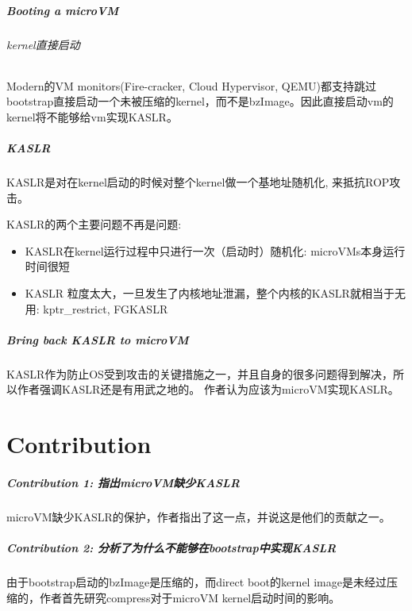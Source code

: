 \documentclass[
    aspectratio=169,  %
]{ctexbeamer}
\begin{document}
\begin{frame}
  \frametitle{Booting a microVM}
  \framesubtitle{kernel直接启动}

  Modern的VM monitors(Fire-cracker, Cloud Hypervisor, QEMU)都支持跳过bootstrap直接启动一个未被压缩的kernel，而不是bzImage。因此直接启动vm的kernel将不能够给vm实现KASLR。
\end{frame}

\begin{frame}
  \frametitle{KASLR}
  KASLR是对在kernel启动的时候对整个kernel做一个基地址随机化, 来抵抗ROP攻击。

  KASLR的两个主要问题不再是问题:
  \begin{itemize}
    \item KASLR在kernel运行过程中只进行一次（启动时）随机化: microVMs本身运行时间很短
    \item KASLR 粒度太大，一旦发生了内核地址泄漏，整个内核的KASLR就相当于无用: kptr\_restrict, FGKASLR
  \end{itemize}
\end{frame}

\begin{frame}
  \frametitle{Bring back KASLR to microVM}

  KASLR作为防止OS受到攻击的关键措施之一，并且自身的很多问题得到解决，所以作者强调KASLR还是有用武之地的。
  作者认为应该为microVM实现KASLR。

\end{frame}

\part{Contribution}

\begin{frame}
  \frametitle{Contribution 1: 指出microVM缺少KASLR}
  microVM缺少KASLR的保护，作者指出了这一点，并说这是他们的贡献之一。
\end{frame}

\begin{frame}
  \frametitle{Contribution 2: 分析了为什么不能够在bootstrap中实现KASLR}
  由于bootstrap启动的bzImage是压缩的，而direct boot的kernel image是未经过压缩的，作者首先研究compress对于microVM kernel启动时间的影响。
\end{frame}
\end{document}
